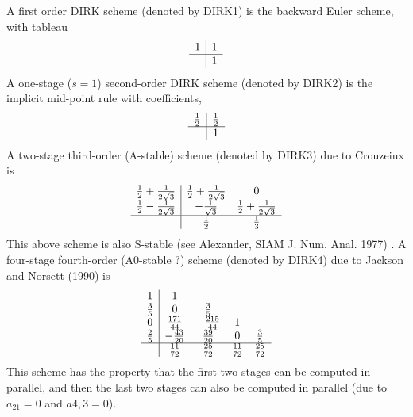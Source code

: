 A first order DIRK scheme (denoted by DIRK1) is the backward Euler scheme, with tableau
\begin{align}
 \begin{array}{c|c}
  1 & 1 \\
  \hline
     & 1
 \end{array}
\end{align}
A one-stage ($s=1$) second-order DIRK scheme (denoted by DIRK2) is the implicit mid-point rule with coefficients,
\begin{align}
 \begin{array}{c|c}
  {1\over2} & {1\over2} \\
  \hline
     & 1
 \end{array}
\end{align}
A two-stage third-order (A-stable) scheme (denoted by DIRK3) due to Crouzeiux is
\begin{align}
 \begin{array}{c|cc}
  {1\over2}+\frac{1}{2\sqrt{3}} & {1\over2}+\frac{1}{2\sqrt{3}} &       0                     \\
  {1\over2}-\frac{1}{2\sqrt{3}} & -\frac{1}{\sqrt{3}}       & {1\over2}+\frac{1}{2\sqrt{3}}   \\
  \hline
     & {1\over2} & \frac{1}{3} 
 \end{array}
\end{align}
This above scheme is also S-stable (see Alexander, SIAM J. Num. Anal. 1977) .
A four-stage fourth-order (A0-stable ?) scheme (denoted by DIRK4) due to Jackson and Norsett (1990) is
\begin{align}
 \begin{array}{c|cccc}
         1          &          1                &                      &                &         \\
   \frac{3}{5}      &          0                & \frac{3}{5}          &                &          \\
         0          &   \frac{171}{44}          & -\frac{215}{44}      &     1          &       \\
   \frac{2}{5}      &  -\frac{43}{20}           & \frac{39}{20}        &     0          &   \frac{3}{5}   \\
  \hline
                    & \frac{11}{72}             & \frac{25}{72}        & \frac{11}{72}  & \frac{25}{72}            
 \end{array}
\end{align}
This scheme has the property that the first two stages can be computed in parallel, and then the
last two stages can also be computed in parallel (due to $a_{21}=0$ and $a{4,3}=0$).


